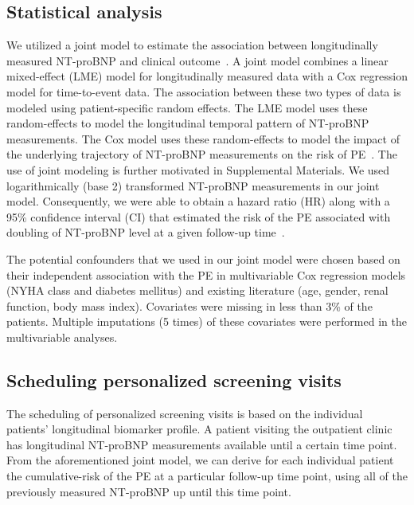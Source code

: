 \subsection{Statistical analysis}
We utilized a joint model to estimate the association between longitudinally measured NT-proBNP and clinical outcome~\citep{rizopoulos2012joint,tsiatis2004joint}. A joint model combines a linear mixed-effect (LME) model for longitudinally measured data with a Cox regression model for time-to-event data. The association between these two types of data is modeled using patient-specific random effects. The LME model uses these random-effects to model the longitudinal temporal pattern of NT-proBNP measurements. The Cox model uses these random-effects to model the impact of the underlying trajectory of NT-proBNP measurements on the risk of PE~\citep{rizopoulos2016personalized,van2018toward}. The use of joint modeling is further motivated in Supplemental Materials. We used logarithmically (base 2) transformed NT-proBNP measurements in our joint model. Consequently, we were able to obtain a hazard ratio (HR) along with a 95\% confidence interval (CI) that estimated the risk of the PE associated with doubling of NT-proBNP level at a given follow-up time~\citep{van2018toward}.

The potential confounders that we used in our joint model were chosen based on their independent association with the PE in multivariable Cox regression models (NYHA class and diabetes mellitus) and existing literature (age, gender, renal function, body mass index). Covariates were missing in less than 3\% of the patients. Multiple imputations (5 times) of these covariates were performed in the multivariable analyses. 

\subsection{Scheduling personalized screening visits}
The scheduling of personalized screening visits is based on the individual patients' longitudinal biomarker profile. A patient visiting the outpatient clinic has longitudinal NT-proBNP measurements available until a certain time point. From the aforementioned joint model, we can derive for each individual patient the cumulative-risk of the PE at a particular follow-up time point, using all of the previously measured NT-proBNP up until this time point. 

